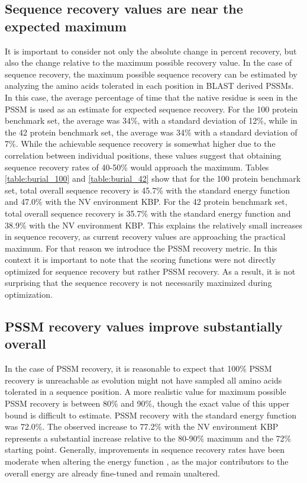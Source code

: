 \subsection{Sequence recovery values are near the expected maximum}
It is important to consider not only the absolute change in percent recovery, but also the change relative to the maximum possible recovery value.
In the case of sequence recovery, the maximum possible sequence recovery can be estimated by analyzing the amino acids tolerated in each position in \ac{BLAST} derived \ac{PSSM}s.
In this case, the average percentage of time that the native residue is seen in the \ac{PSSM} is used as an estimate for expected sequence recovery.
For the 100 protein benchmark set, the average was 34\%, with a standard deviation of 12\%, while in the 42 protein benchmark set, the average was 34\% with a standard deviation of 7\%.
While the achievable sequence recovery is somewhat higher due to the correlation between individual positions, these values suggest that obtaining sequence recovery rates of 40-50\% would approach the maximum.
Tables \ref{table:burial_100} and \ref{table:burial_42} show that for the 100 protein benchmark set, total overall sequence recovery is 45.7\% with the standard energy function and 47.0\% with the \ac{NV} environment \ac{KBP}.
For the 42 protein benchmark set, total overall sequence recovery is 35.7\% with the standard energy function and 38.9\% with the \ac{NV} environment \ac{KBP}.
This explains the relatively small increases in sequence recovery, as current recovery values are approaching the practical maximum.
For that reason we introduce the \ac{PSSM} recovery metric.
In this context it is important to note that the scoring functions were not directly optimized for sequence recovery but rather \ac{PSSM} recovery.
As a result, it is not surprising that the sequence recovery is not necessarily maximized during optimization. 

\subsection{PSSM recovery values improve substantially overall}
In the case of \ac{PSSM} recovery, it is reasonable to expect that 100\% \ac{PSSM} recovery is unreachable as evolution might not have sampled all amino acids tolerated in a sequence position.
A more realistic value for maximum possible \ac{PSSM} recovery is between 80\% and 90\%, though the exact value of this upper bound is difficult to estimate. \ac{PSSM} recovery with the standard energy function was 72.0\%.
The observed increase to 77.2\% with the \ac{NV} environment \ac{KBP} represents a substantial increase relative to the 80-90\% maximum and the 72\% starting point.
Generally, improvements in sequence recovery rates have been moderate when altering the energy function \citep{Kortemme:2003td}, as the major contributors to the overall energy are already fine-tuned and remain unaltered. 

